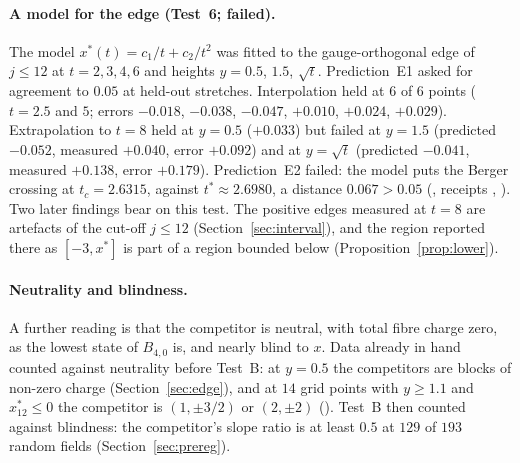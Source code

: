 \documentclass[11pt]{article}
\theoremstyle{definition}
\theoremstyle{remark}
\begin{document}
\paragraph{A model for the edge (Test~6; failed).} The model $x^*(t)=c_1/t+c_2/t^2$ was fitted to the gauge-orthogonal
edge of $j\le12$ at $t=2,3,4,6$ and heights $y=0.5$, $1.5$, $\sqrt t$. Prediction~E1 asked for agreement to $0.05$ at
held-out stretches. Interpolation held at $6$ of $6$ points ($t=2.5$ and $5$; errors $-0.018$, $-0.038$, $-0.047$,
$+0.010$, $+0.024$, $+0.029$). Extrapolation to $t=8$ held at $y=0.5$ ($+0.033$) but failed at $y=1.5$ (predicted
$-0.052$, measured $+0.040$, error $+0.092$) and at $y=\sqrt t$ (predicted $-0.041$, measured $+0.138$, error $+0.179$).
Prediction~E2 failed: the model puts the Berger crossing at $t_c=2.6315$, against $t^*\approx2.6980$, a distance
$0.067>0.05$ (, receipts ,
). Two later findings bear on this test. The positive edges measured at $t=8$ are
artefacts of the cut-off $j\le12$ (Section~\ref{sec:interval}), and the region reported there as $[-3,x^*]$ is part of
a region bounded below (Proposition~\ref{prop:lower}).

\paragraph{Neutrality and blindness.} A further reading is that the competitor is neutral, with total fibre charge
zero, as the lowest state of $B_{4,0}$ is, and nearly blind to $x$. Data already in hand counted against neutrality
before Test~B: at $y=0.5$ the competitors are blocks of non-zero charge (Section~\ref{sec:edge}), and at $14$ grid points
with $y\ge1.1$ and $x^*_{12}\le0$ the competitor is $(1,\pm3/2)$ or $(2,\pm2)$ (). Test~B
then counted against blindness: the competitor's slope ratio is at least $0.5$ at $129$ of $193$ random fields
(Section~\ref{sec:prereg}).
\end{document}
